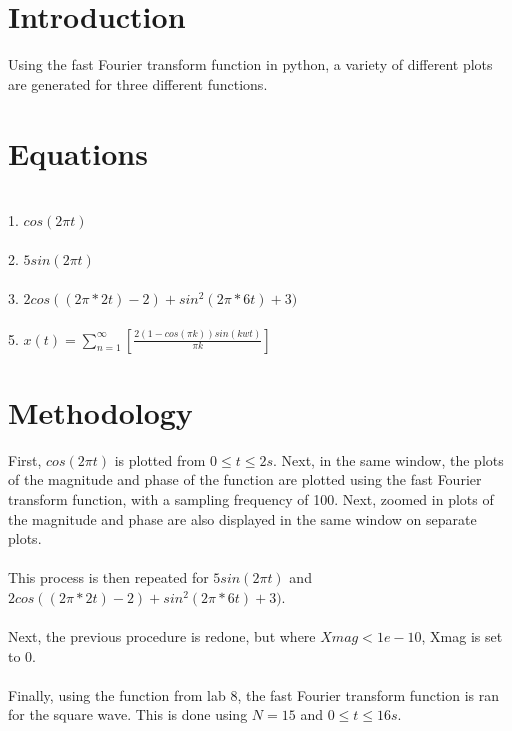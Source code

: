 \documentclass[12pt]{report}
\begin{document}
\section{Introduction}
Using the fast Fourier transform function in python, a variety of different plots are generated for three different functions.

\section{Equations}
\\1. $cos(2\pi t)$
\\
\\2. $5sin(2\pi t)$
\\
\\3. $2cos((2\pi * 2t) - 2) + sin^2(2\pi * 6t) + 3)$
\\
\\5. $x(t) = \sum_{n=1}^{\infty} [\frac{2(1-cos(\pi k))sin(kwt)}{\pi k}]$



\section{Methodology}
First, $cos(2\pi t)$ is plotted from $0\leq t\leq 2s$. Next, in the same window, the plots of the magnitude and phase of the function are plotted using the fast Fourier transform function, with a sampling frequency of 100. Next, zoomed in plots of the magnitude and phase are also displayed in the same window on separate plots.
\\
\\This process is then repeated for $5sin(2\pi t)$ and $2cos((2\pi * 2t) - 2) + sin^2(2\pi * 6t) + 3)$.
\\
\\Next, the previous procedure is redone, but where $Xmag<1e-10$, Xmag is set to 0. 
\\
\\Finally, using the function from lab 8, the fast Fourier transform function is ran for the square wave. This is done using $N=15$ and $0\leq t\leq 16s$.
\end{document}
